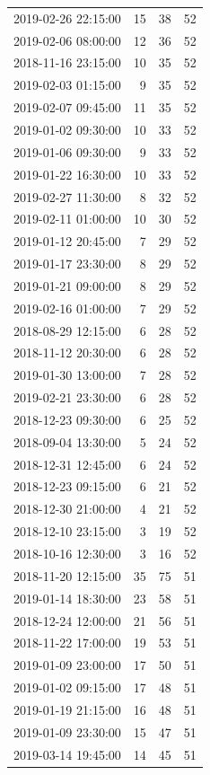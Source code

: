 \begin{tabular}{lrrr}
2019-02-26 22:15:00 & 15 & 38 & 52 \\
2019-02-06 08:00:00 & 12 & 36 & 52 \\
2018-11-16 23:15:00 & 10 & 35 & 52 \\
2019-02-03 01:15:00 & 9 & 35 & 52 \\
2019-02-07 09:45:00 & 11 & 35 & 52 \\
2019-01-02 09:30:00 & 10 & 33 & 52 \\
2019-01-06 09:30:00 & 9 & 33 & 52 \\
2019-01-22 16:30:00 & 10 & 33 & 52 \\
2019-02-27 11:30:00 & 8 & 32 & 52 \\
2019-02-11 01:00:00 & 10 & 30 & 52 \\
2019-01-12 20:45:00 & 7 & 29 & 52 \\
2019-01-17 23:30:00 & 8 & 29 & 52 \\
2019-01-21 09:00:00 & 8 & 29 & 52 \\
2019-02-16 01:00:00 & 7 & 29 & 52 \\
2018-08-29 12:15:00 & 6 & 28 & 52 \\
2018-11-12 20:30:00 & 6 & 28 & 52 \\
2019-01-30 13:00:00 & 7 & 28 & 52 \\
2019-02-21 23:30:00 & 6 & 28 & 52 \\
2018-12-23 09:30:00 & 6 & 25 & 52 \\
2018-09-04 13:30:00 & 5 & 24 & 52 \\
2018-12-31 12:45:00 & 6 & 24 & 52 \\
2018-12-23 09:15:00 & 6 & 21 & 52 \\
2018-12-30 21:00:00 & 4 & 21 & 52 \\
2018-12-10 23:15:00 & 3 & 19 & 52 \\
2018-10-16 12:30:00 & 3 & 16 & 52 \\
2018-11-20 12:15:00 & 35 & 75 & 51 \\
2019-01-14 18:30:00 & 23 & 58 & 51 \\
2018-12-24 12:00:00 & 21 & 56 & 51 \\
2018-11-22 17:00:00 & 19 & 53 & 51 \\
2019-01-09 23:00:00 & 17 & 50 & 51 \\
2019-01-02 09:15:00 & 17 & 48 & 51 \\
2019-01-19 21:15:00 & 16 & 48 & 51 \\
2019-01-09 23:30:00 & 15 & 47 & 51 \\
2019-03-14 19:45:00 & 14 & 45 & 51 \\

\end{tabular}
